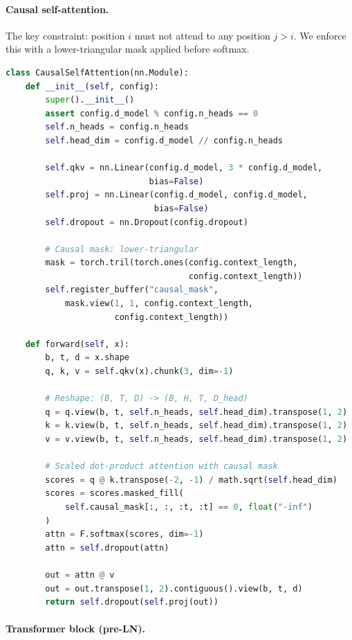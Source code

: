 \paragraph{Causal self-attention.}

The key constraint: position $i$ must not attend to any position $j > i$.
We enforce this with a lower-triangular mask applied before softmax.

\begin{lstlisting}[language=python, caption={Causal multi-head self-attention}]
class CausalSelfAttention(nn.Module):
    def __init__(self, config):
        super().__init__()
        assert config.d_model % config.n_heads == 0
        self.n_heads = config.n_heads
        self.head_dim = config.d_model // config.n_heads

        self.qkv = nn.Linear(config.d_model, 3 * config.d_model,
                             bias=False)
        self.proj = nn.Linear(config.d_model, config.d_model,
                              bias=False)
        self.dropout = nn.Dropout(config.dropout)

        # Causal mask: lower-triangular
        mask = torch.tril(torch.ones(config.context_length,
                                     config.context_length))
        self.register_buffer("causal_mask",
            mask.view(1, 1, config.context_length,
                      config.context_length))

    def forward(self, x):
        b, t, d = x.shape
        q, k, v = self.qkv(x).chunk(3, dim=-1)

        # Reshape: (B, T, D) -> (B, H, T, D_head)
        q = q.view(b, t, self.n_heads, self.head_dim).transpose(1, 2)
        k = k.view(b, t, self.n_heads, self.head_dim).transpose(1, 2)
        v = v.view(b, t, self.n_heads, self.head_dim).transpose(1, 2)

        # Scaled dot-product attention with causal mask
        scores = q @ k.transpose(-2, -1) / math.sqrt(self.head_dim)
        scores = scores.masked_fill(
            self.causal_mask[:, :, :t, :t] == 0, float("-inf")
        )
        attn = F.softmax(scores, dim=-1)
        attn = self.dropout(attn)

        out = attn @ v
        out = out.transpose(1, 2).contiguous().view(b, t, d)
        return self.dropout(self.proj(out))
\end{lstlisting}

\paragraph{Transformer block (pre-LN).}

